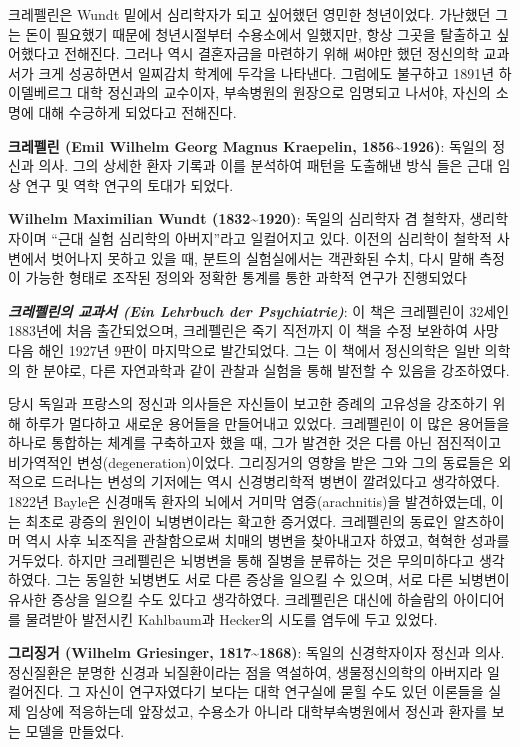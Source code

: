 \documentclass[
]{article}
\begin{document}
크레펠린은 Wundt 밑에서 심리학자가 되고 싶어했던 영민한 청년이었다.
가난했던 그는 돈이 필요했기 때문에 청년시절부터 수용소에서 일했지만,
항상 그곳을 탈출하고 싶어했다고 전해진다. 그러나 역시 결혼자금을
마련하기 위해 써야만 했던 정신의학 교과서가 크게 성공하면서 일찌감치
학계에 두각을 나타낸다. 그럼에도 불구하고 1891년 하이델베르그 대학
정신과의 교수이자, 부속병원의 원장으로 임명되고 나서야, 자신의 소명에
대해 수긍하게 되었다고 전해진다.

\textbf{크레펠린 (Emil Wilhelm Georg Magnus Kraepelin,
1856\textasciitilde1926)}: 독일의 정신과 의사. 그의 상세한 환자 기록과
이를 분석하여 패턴을 도출해낸 방식 들은 근대 임상 연구 및 역학 연구의
토대가 되었다.

\textbf{Wilhelm Maximilian Wundt (1832\textasciitilde1920)}: 독일의
심리학자 겸 철학자, 생리학자이며 ``근대 실험 심리학의 아버지''라고
일컬어지고 있다. 이전의 심리학이 철학적 사변에서 벗어나지 못하고 있을
때, 분트의 실험실에서는 객관화된 수치, 다시 말해 측정이 가능한 형태로
조작된 정의와 정확한 통계를 통한 과학적 연구가 진행되었다

\textbf{\emph{크레펠린의 교과서 (Ein Lehrbuch der Psychiatrie)}}: 이
책은 크레펠린이 32세인 1883년에 처음 출간되었으며, 크레펠린은 죽기
직전까지 이 책을 수정 보완하여 사망 다음 해인 1927년 9판이 마지막으로
발간되었다. 그는 이 책에서 정신의학은 일반 의학의 한 분야로, 다른
자연과학과 같이 관찰과 실험을 통해 발전할 수 있음을 강조하였다.

당시 독일과 프랑스의 정신과 의사들은 자신들이 보고한 증례의 고유성을
강조하기 위해 하루가 멀다하고 새로운 용어들을 만들어내고 있었다.
크레펠린이 이 많은 용어들을 하나로 통합하는 체계를 구축하고자 했을 때,
그가 발견한 것은 다름 아닌 점진적이고 비가역적인
변성(degeneration)이었다. 그리징거의 영향을 받은 그와 그의 동료들은
외적으로 드러나는 변성의 기저에는 역시 신경병리학적 병변이 깔려있다고
생각하였다. 1822년 Bayle은 신경매독 환자의 뇌에서 거미막
염증(arachnitis)을 발견하였는데, 이는 최초로 광증의 원인이 뇌병변이라는
확고한 증거였다. 크레펠린의 동료인 알츠하이머 역시 사후 뇌조직을
관찰함으로써 치매의 병변을 찾아내고자 하였고, 혁혁한 성과를 거두었다.
하지만 크레펠린은 뇌병변을 통해 질병을 분류하는 것은 무의미하다고
생각하였다. 그는 동일한 뇌병변도 서로 다른 증상을 일으킬 수 있으며, 서로
다른 뇌병변이 유사한 증상을 일으킬 수도 있다고 생각하였다. 크레펠린은
대신에 하슬람의 아이디어를 물려받아 발전시킨 Kahlbaum과 Hecker의 시도를
염두에 두고 있었다.

\textbf{그리징거 (Wilhelm Griesinger, 1817\textasciitilde1868)}: 독일의
신경학자이자 정신과 의사. 정신질환은 분명한 신경과 뇌질환이라는 점을
역설하여, 생물정신의학의 아버지라 일컬어진다. 그 자신이 연구자였다기
보다는 대학 연구실에 묻힐 수도 있던 이론들을 실제 임상에 적응하는데
앞장섰고, 수용소가 아니라 대학부속병원에서 정신과 환자를 보는 모델을
만들었다.
\end{document}
